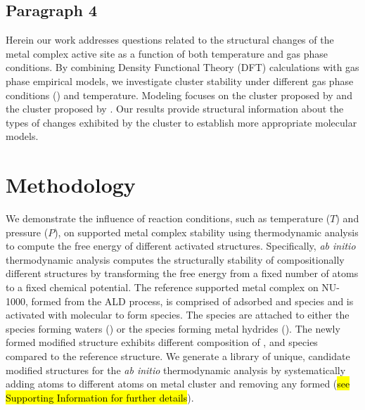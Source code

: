 \documentclass[journal=jctcce,manuscript=article]{achemso}
\begin{document}
\subsection{Paragraph 4}
Herein our work addresses questions related to the structural changes of the metal complex active site as a function of both temperature and gas phase conditions. By combining Density Functional Theory (DFT) calculations with gas phase empirical models, we investigate cluster stability under different gas phase conditions () and temperature. Modeling focuses on the  cluster proposed by \citeauthor{PlateroPrats2017} and the  cluster proposed by \cite{Ikuno2017}. Our results provide structural information about the types of changes exhibited by the cluster to establish more appropriate molecular models. 


\newpage
\section{Methodology}
We demonstrate the influence of reaction conditions, such as temperature ($T$) and pressure ($P$), on supported metal complex stability using thermodynamic analysis to compute the free energy of different activated structures. Specifically, \textit{ab initio} thermodynamic analysis computes the structurally stability of compositionally different structures by transforming the free energy from a fixed number of atoms to a fixed chemical potential. The reference supported metal complex on NU-1000, formed from the ALD process, is comprised of adsorbed  and  species and is activated with molecular  to form  species. The  species are attached to either the  species forming waters () or the  species forming metal hydrides (). The newly formed modified structure exhibits different composition of ,  and  species compared to the reference structure. We generate a library of unique, candidate modified structures for the \textit{ab initio} thermodynamic analysis by systematically adding  atoms to different atoms on metal cluster and removing any formed  (\hl{see Supporting Information for further details}).
\end{document}
